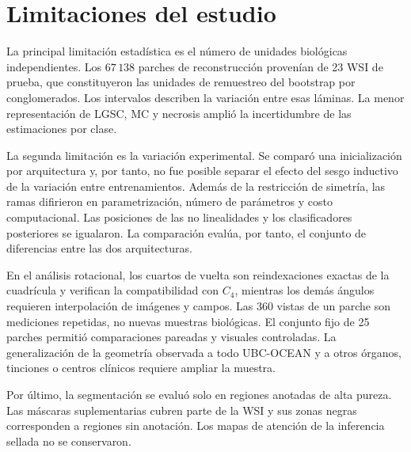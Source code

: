 \section{Limitaciones del estudio}

La principal limitación estadística es el número de unidades biológicas
independientes. Los \(67\,138\) parches de reconstrucción provenían de 23 WSI
de prueba, que constituyeron las unidades de remuestreo del bootstrap por
conglomerados. Los intervalos describen la variación entre esas láminas. La
menor representación de LGSC, MC y necrosis amplió la incertidumbre de las
estimaciones por clase.

La segunda limitación es la variación experimental. Se comparó una
inicialización por arquitectura y, por tanto, no fue posible separar el efecto
del sesgo inductivo de la variación entre entrenamientos. Además de la
restricción de simetría, las ramas difirieron en parametrización, número de
parámetros y costo computacional. Las posiciones de las no linealidades y los
clasificadores posteriores se igualaron. La comparación evalúa, por tanto,
el conjunto de diferencias entre las dos arquitecturas.

En el análisis rotacional, los cuartos de vuelta
son reindexaciones exactas de la cuadrícula y verifican la compatibilidad con
\(C_4\), mientras los demás ángulos requieren interpolación de imágenes y
campos. Las 360 vistas de un parche son mediciones repetidas, no nuevas muestras
biológicas. El conjunto fijo de 25 parches permitió comparaciones pareadas y
visuales controladas. La generalización de la geometría observada a todo
UBC-OCEAN y a otros órganos, tinciones o centros clínicos requiere ampliar la
muestra.

Por último, la segmentación se evaluó solo en regiones anotadas de alta pureza.
Las máscaras suplementarias cubren parte de la WSI y sus zonas negras
corresponden a regiones sin anotación. Los mapas de atención de la inferencia
sellada no se conservaron.
